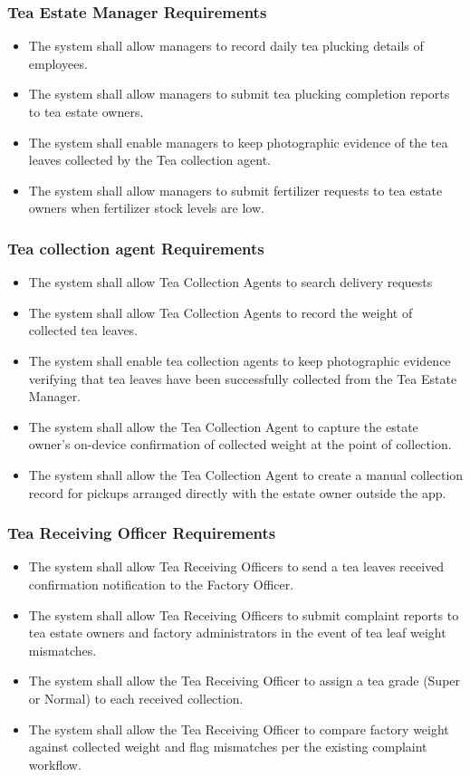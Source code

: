 \subsubsection{Tea Estate Manager Requirements}
\begin{itemize}
    \item The system shall allow managers to record daily tea plucking details of employees.
    \item The system shall allow managers to submit tea plucking completion reports to tea estate owners.
    \item The system shall enable managers to keep photographic evidence of the tea leaves collected by the Tea collection agent.
    \item The system shall allow managers to submit fertilizer requests to tea estate owners when fertilizer stock levels are low.
\end{itemize}

\subsubsection{Tea collection agent Requirements}
\begin{itemize}
    \item The system shall allow Tea Collection Agents to search delivery requests
    \item The system shall allow Tea Collection Agents to record the weight of collected tea leaves.
    \item The system shall enable tea collection agents to keep photographic evidence verifying that tea leaves have been successfully collected from the Tea Estate Manager.
    \item The system shall allow the Tea Collection Agent to capture the estate owner's on-device confirmation of collected weight at the point of collection.
    \item The system shall allow the Tea Collection Agent to create a manual collection record for pickups arranged directly with the estate owner outside the app.  
\end{itemize}

\subsubsection{Tea Receiving Officer Requirements}
\begin{itemize}
    \item The system shall allow Tea Receiving Officers to send a tea leaves received confirmation notification to the Factory Officer.
    \item The system shall allow Tea Receiving Officers to submit complaint reports to tea estate owners and factory administrators in the event of tea leaf weight mismatches.
    \item The system shall allow the Tea Receiving Officer to assign a tea grade (Super or Normal) to each received collection. 
    \item The system shall allow the Tea Receiving Officer to compare factory weight against collected weight and flag mismatches per the existing complaint workflow.
\end{itemize}

